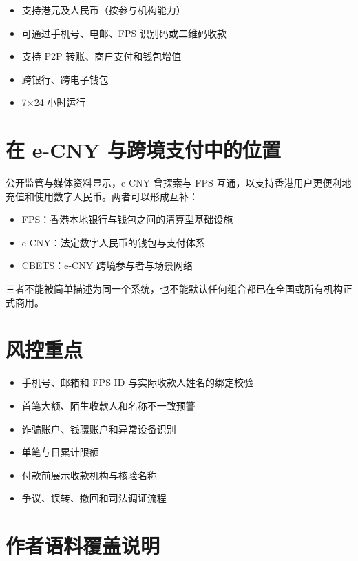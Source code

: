 \begin{itemize}
\tightlist
\item
  支持港元及人民币（按参与机构能力）
\item
  可通过手机号、电邮、FPS 识别码或二维码收款
\item
  支持 P2P 转账、商户支付和钱包增值
\item
  跨银行、跨电子钱包
\item
  7×24 小时运行
\end{itemize}

\section{在 e-CNY
与跨境支付中的位置}\label{ux5728-e-cny-ux4e0eux8de8ux5883ux652fux4ed8ux4e2dux7684ux4f4dux7f6e}

公开监管与媒体资料显示，e-CNY 曾探索与 FPS
互通，以支持香港用户更便利地充值和使用数字人民币。两者可以形成互补：

\begin{itemize}
\tightlist
\item
  FPS：香港本地银行与钱包之间的清算型基础设施
\item
  e-CNY：法定数字人民币的钱包与支付体系
\item
  CBETS：e-CNY 跨境参与者与场景网络
\end{itemize}

三者不能被简单描述为同一个系统，也不能默认任何组合都已在全国或所有机构正式商用。

\section{风控重点}\label{ux98ceux63a7ux91cdux70b9}

\begin{itemize}
\tightlist
\item
  手机号、邮箱和 FPS ID 与实际收款人姓名的绑定校验
\item
  首笔大额、陌生收款人和名称不一致预警
\item
  诈骗账户、钱骡账户和异常设备识别
\item
  单笔与日累计限额
\item
  付款前展示收款机构与核验名称
\item
  争议、误转、撤回和司法调证流程
\end{itemize}

\section{作者语料覆盖说明}\label{ux4f5cux8005ux8bedux6599ux8986ux76d6ux8bf4ux660e}

